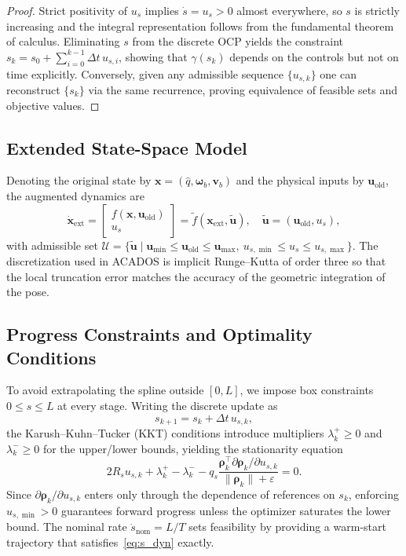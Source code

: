 \documentclass[letterpaper, 10pt, conference]{IEEEtran}
\newcommand{\dq}{\hat{q}}
\begin{document}
\begin{proof}
Strict positivity of $u_s$ implies $\dot{s} = u_s > 0$ almost everywhere, so $s$ is strictly increasing and the integral representation follows from the fundamental theorem of calculus. Eliminating $s$ from the discrete OCP yields the constraint $s_k = s_0 + \sum_{i=0}^{k-1} \Delta t\, u_{s,i}$, showing that $\gamma(s_k)$ depends on the controls but not on time explicitly. Conversely, given any admissible sequence $\{u_{s,k}\}$ one can reconstruct $\{s_k\}$ via the same recurrence, proving equivalence of feasible sets and objective values.
\end{proof}

\subsection{Extended State-Space Model}
Denoting the original state by $\mathbf{x} = (\dq, \boldsymbol{\omega}_b, \mathbf{v}_b)$ and the physical inputs by $\bm{u}_{\text{old}}$, the augmented dynamics are
\begin{equation}
    \dot{\mathbf{x}}_\mathrm{ext} = \begin{bmatrix} f(\mathbf{x}, \bm{u}_{\text{old}}) \\ u_s \end{bmatrix} = \tilde{f}(\mathbf{x}_\mathrm{ext}, \tilde{\bm{u}}), \quad \tilde{\bm{u}} = (\bm{u}_{\text{old}}, u_s),
\end{equation}
with admissible set $\mathcal{U} = \{ \tilde{\bm{u}} \mid \bm{u}_{\min} \leq \bm{u}_{\text{old}} \leq \bm{u}_{\max},\ u_{s,\min} \leq u_s \leq u_{s,\max} \}$. The discretization used in ACADOS is implicit Runge--Kutta of order three so that the local truncation error matches the accuracy of the geometric integration of the pose.

\subsection{Progress Constraints and Optimality Conditions}
To avoid extrapolating the spline outside $[0,L]$, we impose box constraints $0 \leq s \leq L$ at every stage. Writing the discrete update as
\begin{equation}
    s_{k+1} = s_k + \Delta t\, u_{s,k},
\end{equation}
the Karush--Kuhn--Tucker (KKT) conditions introduce multipliers $\lambda_k^+ \geq 0$ and $\lambda_k^- \geq 0$ for the upper/lower bounds, yielding the stationarity equation
\begin{equation}
    2 R_s u_{s,k} + \lambda_k^+ - \lambda_k^- - q_s \frac{\bm{\rho}_k^\top \partial \bm{\rho}_k / \partial u_{s,k}}{\|\bm{\rho}_k\| + \varepsilon} = 0.
\end{equation}
Since $\partial \bm{\rho}_k / \partial u_{s,k}$ enters only through the dependence of references on $s_k$, enforcing $u_{s,\min} > 0$ guarantees forward progress unless the optimizer saturates the lower bound. The nominal rate $\dot{s}_\mathrm{nom} = L/T$ sets feasibility by providing a warm-start trajectory that satisfies~\eqref{eq:s_dyn} exactly.
\end{document}
